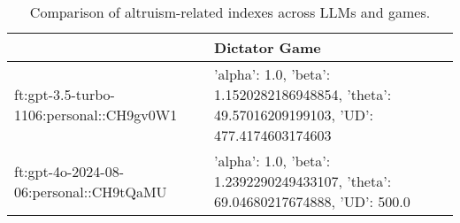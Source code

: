 \begin{table}
\caption{Comparison of altruism-related indexes across LLMs and games.}
\label{tab:altruism_indexes}
\begin{tabular}{ll}
\toprule
 & Dictator Game \\
\midrule
ft:gpt-3.5-turbo-1106:personal::CH9gv0W1 & {'alpha': 1.0, 'beta': 1.1520282186948854, 'theta': 49.57016209199103, 'UD': 477.4174603174603} \\
ft:gpt-4o-2024-08-06:personal::CH9tQaMU & {'alpha': 1.0, 'beta': 1.2392290249433107, 'theta': 69.04680217674888, 'UD': 500.0} \\
\bottomrule
\end{tabular}
\end{table}
